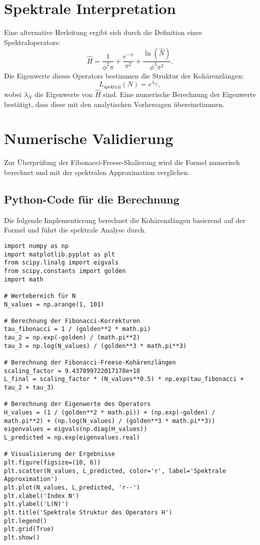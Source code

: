 \documentclass[a4paper,12pt]{article}
\begin{document}
\section{Spektrale Interpretation}
Eine alternative Herleitung ergibt sich durch die Definition eines Spektraloperators:
\begin{equation}
    \hat{H} = \frac{1}{\phi^2 \pi} + \frac{e^{-\phi}}{\pi^2} + \frac{\ln(\hat{N})}{\phi^3 \pi^3}.
\end{equation}
Die Eigenwerte dieses Operators bestimmen die Struktur der Kohärenzlängen:
\begin{equation}
    L_{\text{spektral}}(N) = e^{\lambda_N},
\end{equation}
wobei \( \lambda_N \) die Eigenwerte von \( \hat{H} \) sind. Eine numerische Berechnung der Eigenwerte bestätigt, dass diese mit den analytischen Vorhersagen übereinstimmen.

\section{Numerische Validierung}
Zur Überprüfung der Fibonacci-Freese-Skalierung wird die Formel numerisch berechnet und mit der spektralen Approximation verglichen. 

\subsection{Python-Code für die Berechnung}
Die folgende Implementierung berechnet die Kohärenzlängen basierend auf der Formel und führt die spektrale Analyse durch.

\begin{verbatim}
import numpy as np
import matplotlib.pyplot as plt
from scipy.linalg import eigvals
from scipy.constants import golden
import math

# Wertebereich für N
N_values = np.arange(1, 101)

# Berechnung der Fibonacci-Korrekturen
tau_fibonacci = 1 / (golden**2 * math.pi)
tau_2 = np.exp(-golden) / (math.pi**2)
tau_3 = np.log(N_values) / (golden**3 * math.pi**3)

# Berechnung der Fibonacci-Freese-Kohärenzlängen
scaling_factor = 9.437899722017178e+18
L_final = scaling_factor * (N_values**0.5) * np.exp(tau_fibonacci + tau_2 + tau_3)

# Berechnung der Eigenwerte des Operators
H_values = (1 / (golden**2 * math.pi)) + (np.exp(-golden) / math.pi**2) + (np.log(N_values) / (golden**3 * math.pi**3))
eigenvalues = eigvals(np.diag(H_values))
L_predicted = np.exp(eigenvalues.real)

# Visualisierung der Ergebnisse
plt.figure(figsize=(10, 6))
plt.scatter(N_values, L_predicted, color='r', label='Spektrale Approximation')
plt.plot(N_values, L_predicted, 'r--')
plt.xlabel('Index N')
plt.ylabel('L(N)')
plt.title('Spektrale Struktur des Operators H')
plt.legend()
plt.grid(True)
plt.show()
\end{verbatim}
\end{document}
